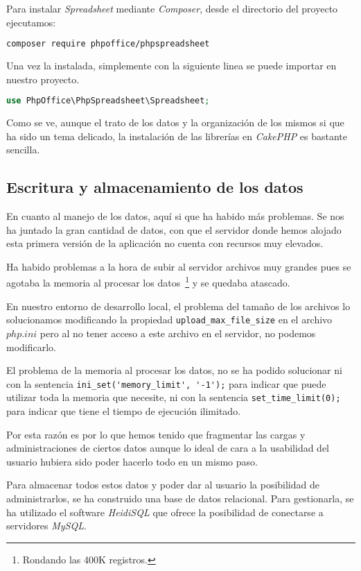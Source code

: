 Para instalar \textit{Spreadsheet} mediante \textit{Composer}, desde el directorio del proyecto ejecutamos:

\begin{lstlisting}[language=bash]
composer require phpoffice/phpspreadsheet
\end{lstlisting}

Una vez la instalada, simplemente con la siguiente linea se puede importar en nuestro proyecto.

\begin{lstlisting}[language=PHP]
use PhpOffice\PhpSpreadsheet\Spreadsheet;
\end{lstlisting}

Como se ve, aunque el trato de los datos y la organización de los mismos si que ha sido un tema delicado, la instalación de las librerías en \textit{CakePHP} es bastante sencilla.

\subsection{Escritura y almacenamiento de los datos}

En cuanto al manejo de los datos, aquí si que ha habido más problemas. Se nos ha juntado la gran cantidad de datos, con que el servidor donde hemos alojado esta primera versión de la aplicación no cuenta con recursos muy elevados.

Ha habido problemas a la hora de subir al servidor archivos muy grandes pues se agotaba la memoria al procesar los datos~\footnote{Rondando las 400K registros.} y se quedaba atascado. 

En nuestro entorno de desarrollo local, el problema del tamaño de los archivos lo solucionamos modificando la propiedad \verb|upload_max_file_size| en el archivo $php.ini$ pero al no tener acceso a este archivo en el servidor, no podemos modificarlo. 

El problema de la memoria al procesar los datos, no se ha podido solucionar ni con la sentencia \verb|ini_set('memory_limit', '-1');| para indicar que puede utilizar toda la memoria que necesite, ni con la sentencia \verb|set_time_limit(0);| para indicar que tiene el tiempo de ejecución ilimitado. 

Por esta razón es por lo que hemos tenido que fragmentar las cargas y administraciones de ciertos datos aunque lo ideal de cara a la usabilidad del usuario hubiera sido poder hacerlo todo en un mismo paso.

Para almacenar todos estos datos y poder dar al usuario la posibilidad de administrarlos, se ha construido una base de datos relacional. Para gestionarla, se ha utilizado el software \textit{HeidiSQL} que ofrece la posibilidad de conectarse a servidores \textit{MySQL}.


